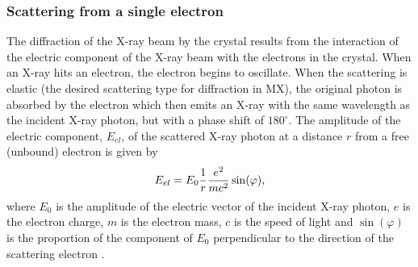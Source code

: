         \subsubsection{Scattering from a single electron}
        \label{subs:Scattering from single electron}
            The diffraction of the X-ray beam by the crystal results from the interaction of the electric component of the X-ray beam with the electrons in the crystal.
            When an X-ray hits an electron, the electron begins to oscillate.
            When the scattering is elastic (the desired scattering type for diffraction in MX), the original photon is absorbed by the electron which then emits an X-ray with the same wavelength as the incident X-ray photon, but with a phase shift of $180^{\circ}$.
            The amplitude of the electric component, $E_{el}$, of the scattered X-ray photon at a distance $r$ from a free (unbound) electron is given by
            \begin{equation}
                E_{el} = E_0 \frac{1}{r}\frac{e^2}{mc^2} \sin(\varphi),
            \end{equation}
            where $E_0$ is the amplitude of the electric vector of the incident X-ray photon, $e$ is the electron charge, $m$ is the electron mass, $c$ is the speed of light and $\sin(\varphi)$ is the proportion of the component of $E_0$ perpendicular to the direction of the scattering electron \cite{drenth2012}.

